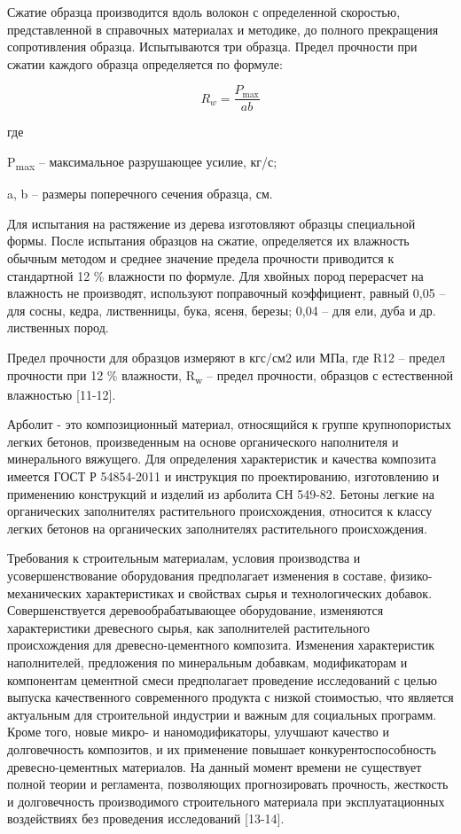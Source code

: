 \begin{multicols}{2}
Сжатие образца производится вдоль волокон с определенной скоростью,
представленной в справочных материалах и методике, до полного
прекращения сопротивления образца. Испытываются три образца. Предел
прочности при сжатии каждого образца определяется по формуле:

\begin{equation}
R_{w} = \frac{P_{\max}}{ab}
\end{equation}

где

P\textsubscript{max} -- максимальное разрушающее усилие, кг/с;

a, b -- размеры поперечного сечения образца, см.

Для испытания на растяжение из дерева изготовляют образцы специальной
формы. После испытания образцов на сжатие, определяется их влажность
обычным методом и среднее значение предела прочности приводится к
стандартной 12 \% влажности по формуле. Для хвойных пород перерасчет на
влажность не производят, используют поправочный коэффициент, равный 0,05
-- для сосны, кедра, лиственницы, бука, ясеня, березы; 0,04 -- для ели,
дуба и др. лиственных пород.

Предел прочности для образцов измеряют в кгс/см2 или МПа, где R12 --
предел прочности при 12 \% влажности, R\textsubscript{w} -- предел
прочности, образцов с естественной влажностью {[}11-12{]}.

Арболит - это композиционный материал, относящийся к группе
крупнопористых легких бетонов, произведенным на основе органического
наполнителя и минерального вяжущего. Для определения характеристик и
качества композита имеется ГОСТ Р 54854-2011 и инструкция по
проектированию, изготовлению и применению конструкций и изделий из
арболита СН 549-82. Бетоны легкие на органических заполнителях
растительного происхождения, относится к классу легких бетонов на
органических заполнителях растительного происхождения.

Требования к строительным материалам, условия производства и
усовершенствование оборудования предполагает изменения в составе,
физико-механических характеристиках и свойствах сырья и технологических
добавок. Совершенствуется деревообрабатывающее оборудование, изменяются
характеристики древесного сырья, как заполнителей растительного
происхождения для древесно-цементного композита. Изменения характеристик
наполнителей, предложения по минеральным добавкам, модификаторам и
компонентам цементной смеси предполагает проведение исследований с целью
выпуска качественного современного продукта с низкой стоимостью, что
является актуальным для строительной индустрии и важным для социальных
программ. Кроме того, новые микро- и наномодификаторы, улучшают качество
и долговечность композитов, и их применение повышает
конкурентоспособность древесно-цементных материалов. На данный момент
времени не существует полной теории и регламента, позволяющих
прогнозировать прочность, жесткость и долговечность производимого
строительного материала при эксплуатационных воздействиях без проведения
исследований {[}13-14{]}.


\end{multicols}
